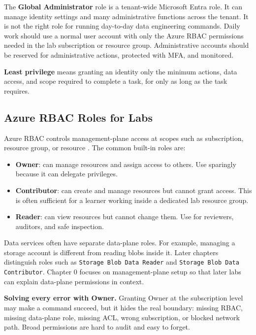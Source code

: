 The \textbf{Global Administrator} role is a tenant-wide Microsoft Entra role. It can manage identity settings and many administrative functions across the tenant. It is not the right role for running day-to-day data engineering commands. Daily work should use a normal user account with only the Azure RBAC permissions needed in the lab subscription or resource group. Administrative accounts should be reserved for administrative actions, protected with MFA, and monitored.

\begin{definitionbox}
\textbf{Least privilege} means granting an identity only the minimum actions, data access, and scope required to complete a task, for only as long as the task requires.
\end{definitionbox}

\subsection{Azure RBAC Roles for Labs}
Azure RBAC controls management-plane access at scopes such as subscription, resource group, or resource \cite{microsoft2025rbac}. The common built-in roles are:

\begin{itemize}
    \item \textbf{Owner}: can manage resources and assign access to others. Use sparingly because it can delegate privileges.
    \item \textbf{Contributor}: can create and manage resources but cannot grant access. This is often sufficient for a learner working inside a dedicated lab resource group.
    \item \textbf{Reader}: can view resources but cannot change them. Use for reviewers, auditors, and safe inspection.
\end{itemize}

Data services often have separate data-plane roles. For example, managing a storage account is different from reading blobs inside it. Later chapters distinguish roles such as \texttt{Storage Blob Data Reader} and \texttt{Storage Blob Data Contributor}. Chapter 0 focuses on management-plane setup so that later labs can explain data-plane permissions in context.

\begin{pitfall}
\textbf{Solving every error with Owner.} Granting Owner at the subscription level may make a command succeed, but it hides the real boundary: missing RBAC, missing data-plane role, missing ACL, wrong subscription, or blocked network path. Broad permissions are hard to audit and easy to forget.
\end{pitfall}

